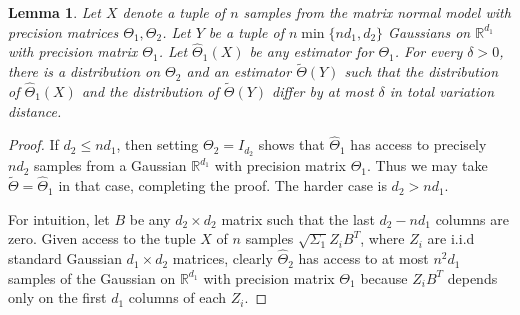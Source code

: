\documentclass[aos]{imsart}
\newtheorem{lemma}[theorem]{Lemma}
\theoremstyle{definition}
\numberwithin{equation}{section}
\newcommand{\R}{{\mathbb{R}}}
\newcommand{\htheta}{\widehat{\Theta}}
\begin{document}
\begin{lemma}\label{lem:reduce-lower}
Let $X$ denote a tuple of $n$ samples from the matrix normal model with precision matrices $\Theta_1, \Theta_2$.
Let $Y$ be a tuple of $n\min\{nd_1, d_2\}$ Gaussians on $\R^{d_1}$ with precision matrix $\Theta_1$.
Let $\widehat{\Theta}_1(X)$ be any estimator for $\Theta_1$.
For every $\delta > 0$, there is a distribution on $\Theta_2$ and an estimator $\tilde{\Theta}(Y)$ such that the distribution of $\widehat{\Theta}_1(X)$ and the distribution of $\tilde{\Theta}(Y)$ differ by at most $\delta$ in total variation distance.
\end{lemma}
\begin{proof}
If $d_2 \leq nd_1$, then setting $\Theta_2 = I_{d_2}$ shows that $\htheta_1$ has access to precisely $n d_2$ samples from a Gaussian $\R^{d_1}$ with precision matrix $\Theta_1$.
Thus we may take $\tilde{\Theta} = \htheta_1$ in that case, completing the proof. The harder case is $d_2 > n d_1$.

For intuition, let $B$ be any $d_2\times d_2$ matrix such that the last $d_2 - nd_1$ columns are zero.
Given access to the tuple $X$ of $n$ samples $\sqrt{\Sigma_1} Z_i B^T$, where $Z_i$ are i.i.d standard Gaussian $d_1\times d_2$ matrices, clearly $\widehat{\Theta}_2$ has access to at most $n^2 d_1$ samples of the Gaussian on $\R^{d_1}$ with precision matrix $\Theta_1$ because $Z_i B^T$ depends only on the first $d_1$ columns of each $Z_i$.


\end{proof}
\end{document}
